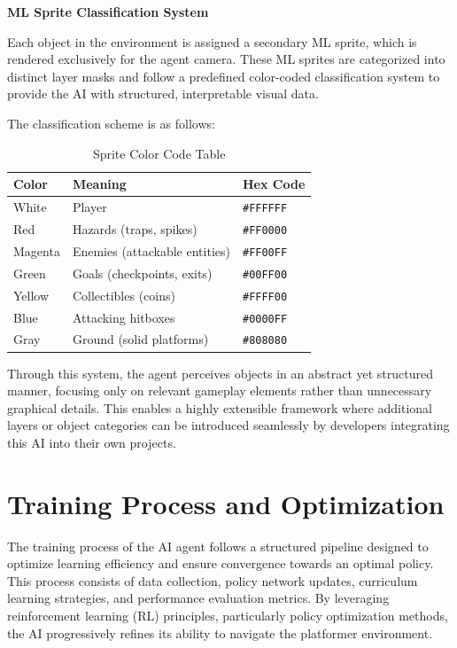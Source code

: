 \documentclass[12pt,oneside,openright,a4paper]{cpe-english-project}
\begin{document}
\textbf{ML Sprite Classification System}\par
Each object in the environment is assigned a secondary ML sprite, which is rendered exclusively for the agent camera. These ML sprites are categorized into distinct layer masks and follow a predefined color-coded classification system to provide the AI with structured, interpretable visual data.\par
The classification scheme is as follows:\par
\begin{table}[!h]
\caption{Sprite Color Code Table}\label{tbl:Sprite Color Code Table}
\begin{tabular}{|l|l|l|} \hline
\textbf{Color} & \textbf{Meaning} & \textbf{Hex Code} \\ \hline
White & Player & \texttt{\#FFFFFF} \\ 
Red & Hazards (traps, spikes) & \texttt{\#FF0000} \\ 
Magenta & 	Enemies (attackable entities) & \texttt{\#FF00FF}  \\ 
Green & Goals (checkpoints, exits) & \texttt{\#00FF00} \\ 
Yellow & Collectibles (coins) & \texttt{\#FFFF00} \\ 
Blue & Attacking hitboxes & \texttt{\#0000FF} \\ 
Gray & Ground (solid platforms) & \texttt{\#808080} \\ \hline
\end{tabular}
\end{table}
Through this system, the agent perceives objects in an abstract yet structured manner, focusing only on relevant gameplay elements rather than unnecessary graphical details. This enables a highly extensible framework where additional layers or object categories can be introduced seamlessly by developers integrating this AI into their own projects.
\section{Training Process and Optimization}
The training process of the AI agent follows a structured pipeline designed to optimize learning efficiency and ensure convergence towards an optimal policy. This process consists of data collection, policy network updates, curriculum learning strategies, and performance evaluation metrics. By leveraging reinforcement learning (RL) principles, particularly policy optimization methods, the AI progressively refines its ability to navigate the platformer environment.
\end{document}
